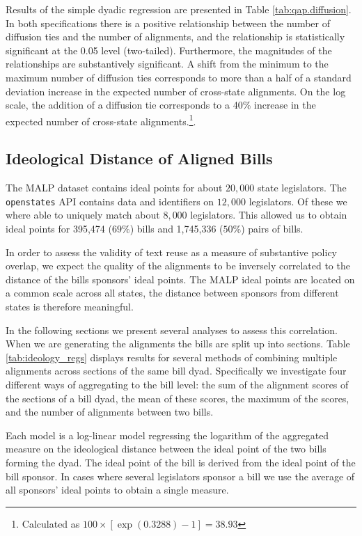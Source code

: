 \documentclass[12pt]{article} %
\begin{document}
Results of the simple dyadic regression are presented in Table \ref{tab:qap.diffusion}. In both specifications there is a positive relationship between the number of diffusion ties and the number of alignments, and the relationship is statistically significant at the 0.05 level (two-tailed). Furthermore, the magnitudes of the relationships are substantively significant. A shift from the minimum to the maximum number of diffusion ties corresponds to more than a half of a standard deviation increase in the expected number of cross-state alignments. On the log scale, the addition of a diffusion tie corresponds to a 40\% increase in the expected number of cross-state alignments.\footnote{Calculated as $100\times \left[ \exp(0.3288)-1\right] = 38.93$}. 


\subsection{Ideological Distance of Aligned Bills}


The MALP dataset contains ideal points for about $20,000$ state legislators. The \texttt{openstates} API contains data and identifiers on $12,000$ legislators. Of these we where able to uniquely match about $8,000$ legislators. This allowed us to obtain ideal points for 395,474 ($69\%$) bills and 1,745,336 ($50\%$) pairs of bills. 

In order to assess the validity of text reuse as a measure of substantive policy overlap, we expect the quality of the alignments to be inversely correlated to the distance of the bills sponsors' ideal points. The MALP ideal points are located on a common scale across all states, the distance between sponsors from different states is therefore meaningful. 

In the following sections we present several analyses to assess this correlation. When we are generating the alignments the bills are split up into sections. Table \ref{tab:ideology_regs} displays results for several methods of combining multiple alignments across sections of the same bill dyad. Specifically we investigate four different ways of aggregating to the bill level: the sum of the alignment scores of the sections of a bill dyad, the mean of these scores, the maximum of the scores, and the number of alignments between two bills. 

Each model is a log-linear model regressing the logarithm of the aggregated measure on the ideological distance between the ideal point of the two bills forming the dyad. The ideal point of the bill is derived from the ideal point of the bill sponsor. In cases where several legislators sponsor a bill we use the average of all sponsors' ideal points to obtain a single measure.
\end{document}
